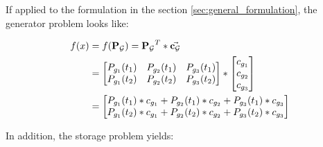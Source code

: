 If applied to the formulation in the section \ref{sec:general_formulation}, the generator problem looks like:

\begin{subequations}
	\begin{align}
		f(x) &= f(\vb{P_\mathcal{G}}) = \vb{P_\mathcal{G}}^T * \va{c_\mathcal{G}}\\
		& = \begin{bmatrix}
			P_{g_1}(t_1) & P_{g_2}(t_1) & P_{g_3}(t_1) \\
			P_{g_1}(t_2) & P_{g_2}(t_2) & P_{g_3}(t_2)
		\end{bmatrix} * \begin{bmatrix}
			c_{g_1} \\
			c_{g_2} \\
			c_{g_3}
		\end{bmatrix} \\
		& = \begin{bmatrix}
			P_{g_1}(t_1) * c_{g_1} + P_{g_2}(t_1) * c_{g_2} + P_{g_3}(t_1) * c_{g_3} \\
			P_{g_1}(t_2) * c_{g_1} + P_{g_2}(t_2) * c_{g_2} + P_{g_3}(t_2) * c_{g_3} \\
		\end{bmatrix}
	\end{align}
\end{subequations}

In addition, the storage problem yields:

